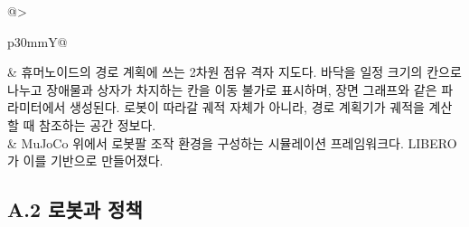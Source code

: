 \begin{table}[H]
\begin{tabularx}{\linewidth}{@{}>{\raggedright\arraybackslash}p{30mm}Y@{}}
 & 휴머노이드의 경로 계획에 쓰는 2차원 점유 격자 지도다. 바닥을 일정 크기의 칸으로 나누고 장애물과 상자가 차지하는 칸을 이동 불가로 표시하며, 장면 그래프와 같은 파라미터에서 생성된다. 로봇이 따라갈 궤적 자체가 아니라, 경로 계획기가 궤적을 계산할 때 참조하는 공간 정보다. \\
 & MuJoCo 위에서 로봇팔 조작 환경을 구성하는 시뮬레이션 프레임워크다. LIBERO가 이를 기반으로 만들어졌다. \\
\bottomrule
\end{tabularx}
\end{table}

\subsection*{A.2 로봇과 정책}
